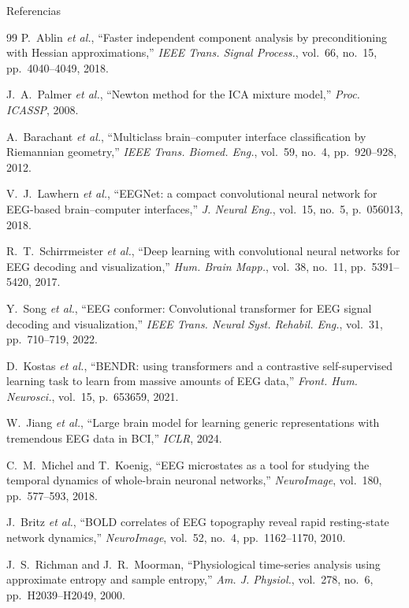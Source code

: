 \begin{frame}[allowframebreaks]{Referencias}
\begin{thebibliography}{99}
    P.~Ablin \textit{et al.}, ``Faster independent component analysis by preconditioning
    with Hessian approximations,''
    \textit{IEEE Trans. Signal Process.}, vol.~66, no.~15, pp.~4040--4049, 2018.

    J.~A.~Palmer \textit{et al.}, ``Newton method for the ICA mixture model,''
    \textit{Proc. ICASSP}, 2008.

    A.~Barachant \textit{et al.}, ``Multiclass brain--computer interface classification
    by Riemannian geometry,''
    \textit{IEEE Trans. Biomed. Eng.}, vol.~59, no.~4, pp.~920--928, 2012.

    V.~J.~Lawhern \textit{et al.}, ``EEGNet: a compact convolutional neural network
    for EEG-based brain--computer interfaces,''
    \textit{J. Neural Eng.}, vol.~15, no.~5, p.~056013, 2018.

    R.~T.~Schirrmeister \textit{et al.}, ``Deep learning with convolutional neural networks
    for EEG decoding and visualization,''
    \textit{Hum. Brain Mapp.}, vol.~38, no.~11, pp.~5391--5420, 2017.

    Y.~Song \textit{et al.}, ``EEG conformer: Convolutional transformer for EEG
    signal decoding and visualization,''
    \textit{IEEE Trans. Neural Syst. Rehabil. Eng.}, vol.~31, pp.~710--719, 2022.

    D.~Kostas \textit{et al.}, ``BENDR: using transformers and a contrastive
    self-supervised learning task to learn from massive amounts of EEG data,''
    \textit{Front. Hum. Neurosci.}, vol.~15, p.~653659, 2021.

    W.~Jiang \textit{et al.}, ``Large brain model for learning generic representations
    with tremendous EEG data in BCI,''
    \textit{ICLR}, 2024.

    C.~M.~Michel and T.~Koenig, ``EEG microstates as a tool for studying the temporal
    dynamics of whole-brain neuronal networks,''
    \textit{NeuroImage}, vol.~180, pp.~577--593, 2018.

    J.~Britz \textit{et al.}, ``BOLD correlates of EEG topography reveal rapid
    resting-state network dynamics,''
    \textit{NeuroImage}, vol.~52, no.~4, pp.~1162--1170, 2010.

    J.~S.~Richman and J.~R.~Moorman, ``Physiological time-series analysis using
    approximate entropy and sample entropy,''
    \textit{Am. J. Physiol.}, vol.~278, no.~6, pp.~H2039--H2049, 2000.


\end{thebibliography}
\end{frame}
